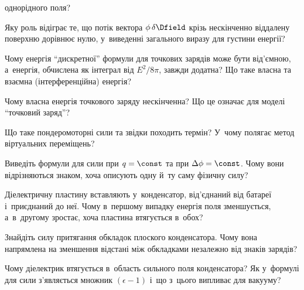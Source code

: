 \begin{Questions}
\begin{quizlist}
	  однорідного поля?
	\item Яку роль відіграє те, що потік вектора $\phi\,\delta\Dfield$ крізь нескінченно
	  віддалену поверхню дорівнює нулю, у~виведенні загального виразу для густини енергії?
	\item Чому енергія \enquote{дискретної} формули для точкових зарядів може бути
	  від'ємною, а~енергія, обчислена як інтеграл від $E^2/8\pi$, завжди додатна? Що таке
	  власна та взаємна (інтерференційна) енергія?
	\item Чому власна енергія точкового заряду нескінченна? Що це означає для моделі
	  \enquote{точковий заряд}?
	\item Що таке пондеромоторні сили та звідки походить термін? У~чому полягає метод
	  віртуальних переміщень?
	\item Виведіть формули для сили при $q=\const$ та при $\Delta\phi=\const$. Чому вони
	  відрізняються знаком, хоча описують одну й~ту саму фізичну силу?
	\item Діелектричну пластину вставляють у~конденсатор, від'єднаний від батареї і~приєднаний до неї. Чому в~першому випадку енергія поля зменшується, а~в~другому зростає, хоча пластина втягується в~обох?
	\item Знайдіть силу притягання обкладок плоского конденсатора. Чому вона напрямлена на
	  зменшення відстані між обкладками незалежно від знаків зарядів?
	\item Чому діелектрик втягується в~область сильного поля конденсатора? Як у~формулі
	  для сили з'являється множник $(\epsilon-1)$ і~що з~цього випливає для вакууму?
\end{quizlist}
\end{Questions}

